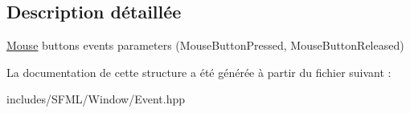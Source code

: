 \subsection{Description détaillée}
\hyperlink{classsf_1_1Mouse}{Mouse} buttons events parameters (Mouse\+Button\+Pressed, Mouse\+Button\+Released) 

La documentation de cette structure a été générée à partir du fichier suivant \+:\begin{DoxyCompactItemize}
\item 
includes/\+S\+F\+M\+L/\+Window/Event.\+hpp\end{DoxyCompactItemize}
